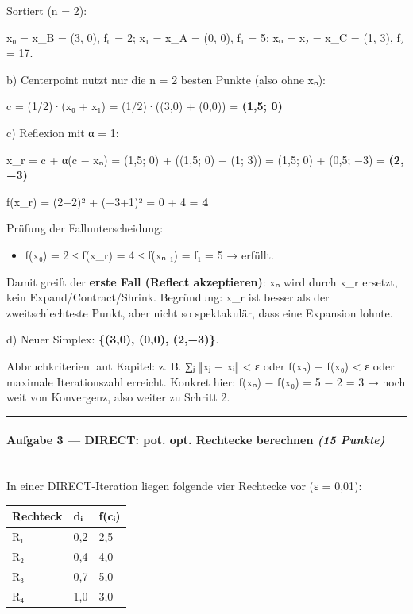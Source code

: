 \documentclass[11pt, a4paper]{article}
\begin{document}
Sortiert (n = 2):

x⃗₀ = x⃗\_B = (3, 0), f₀ = 2;  x⃗₁ = x⃗\_A = (0, 0), f₁ = 5;  x⃗ₙ = x⃗₂ = x⃗\_C = (1, 3), f₂ = 17.


b) Centerpoint nutzt nur die n = 2 besten Punkte (also ohne x⃗ₙ):


c⃗ = (1/2)·(x⃗₀ + x⃗₁) = (1/2)·((3,0) + (0,0)) = \textbf{(1,5; 0)}


c) Reflexion mit α = 1:


x⃗\_r = c⃗ + α(c⃗ − x⃗ₙ) = (1,5; 0) + ((1,5; 0) − (1; 3)) = (1,5; 0) + (0,5; −3) = \textbf{(2, −3)}


f(x⃗\_r) = (2−2)² + (−3+1)² = 0 + 4 = \textbf{4}


Prüfung der Fallunterscheidung:

\begin{itemize}
  \item f(x⃗₀) = 2 ≤ f(x⃗\_r) = 4 ≤ f(x⃗ₙ₋₁) = f₁ = 5 → erfüllt.
\end{itemize}

Damit greift der \textbf{erste Fall (Reflect akzeptieren)}: x⃗ₙ wird durch x⃗\_r ersetzt, kein Expand/Contract/Shrink. Begründung: x⃗\_r ist besser als der zweitschlechteste Punkt, aber nicht so spektakulär, dass eine Expansion lohnte.


d) Neuer Simplex: \textbf{\{(3,0), (0,0), (2,−3)\}}.


Abbruchkriterien laut Kapitel: z. B. ∑ⱼ ‖x⃗ⱼ − x⃗ᵢ‖ < ε oder f(x⃗ₙ) − f(x⃗₀) < ε oder maximale Iterationszahl erreicht. Konkret hier: f(x⃗ₙ) − f(x⃗₀) = 5 − 2 = 3 → noch weit von Konvergenz, also weiter zu Schritt 2.



\noindent\textcolor{rulegray}{\rule{\linewidth}{0.4pt}}


\paragraph{Aufgabe 3 — DIRECT: pot. opt. Rechtecke berechnen \textit{(15 Punkte)}}\mbox{}\\[2pt]

In einer DIRECT-Iteration liegen folgende vier Rechtecke vor (ε = 0,01):



{\small
\begin{tabularx}{\linewidth}{XXX}
\hline
\rowcolor{tableheadbg}
{\color{white}\textbf{Rechteck}} & {\color{white}\textbf{dᵢ}} & {\color{white}\textbf{f(c⃗ᵢ)}} \\[2pt]
\hline
\endhead
\hline
\endfoot
R₁ & 0,2 & 2,5 \\
R₂ & 0,4 & 4,0 \\
R₃ & 0,7 & 5,0 \\
R₄ & 1,0 & 3,0 \\
\end{tabularx}
}
\end{document}

